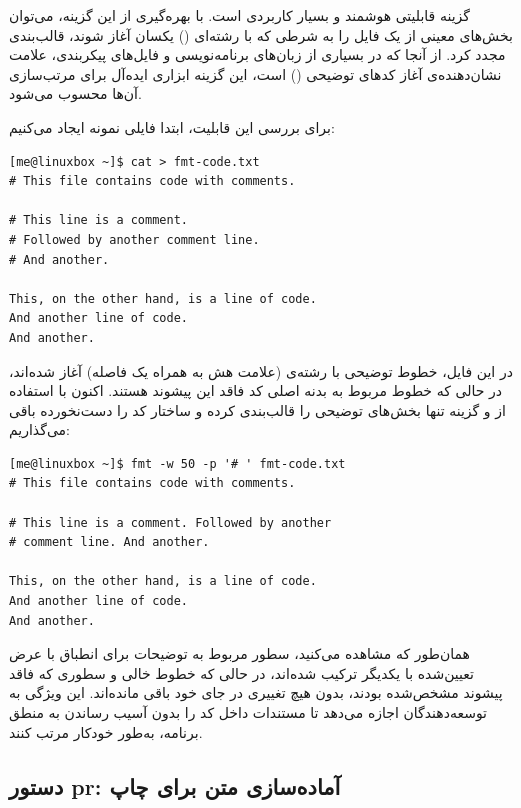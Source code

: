 گزینه  قابلیتی هوشمند و بسیار کاربردی است. با بهره‌گیری از این گزینه، می‌توان بخش‌های معینی از یک فایل را به شرطی که با رشته‌ای () یکسان آغاز شوند، قالب‌بندی مجدد کرد. از آنجا که در بسیاری از زبان‌های برنامه‌نویسی و فایل‌های پیکربندی، علامت \cmd{\#} نشان‌دهنده‌ی آغاز کدهای توضیحی () است، این گزینه ابزاری ایده‌آل برای مرتب‌سازی آن‌ها محسوب می‌شود.

برای بررسی این قابلیت، ابتدا فایلی نمونه ایجاد می‌کنیم:

\begin{latin}
\begin{lstlisting}
[me@linuxbox ~]$ cat > fmt-code.txt
# This file contains code with comments.

# This line is a comment.
# Followed by another comment line.
# And another.

This, on the other hand, is a line of code.
And another line of code.
And another.
\end{lstlisting}
\end{latin}

در این فایل، خطوط توضیحی با رشته‌ی \cmd{\#} (علامت هش به همراه یک فاصله) آغاز شده‌اند، در حالی که خطوط مربوط به بدنه اصلی کد فاقد این پیشوند هستند. اکنون با استفاده از  و گزینه  تنها بخش‌های توضیحی را قالب‌بندی کرده و ساختار کد را دست‌نخورده باقی می‌گذاریم:

\begin{latin}
\begin{lstlisting}
[me@linuxbox ~]$ fmt -w 50 -p '# ' fmt-code.txt
# This file contains code with comments.

# This line is a comment. Followed by another
# comment line. And another.

This, on the other hand, is a line of code.
And another line of code.
And another.
\end{lstlisting}
\end{latin}

همان‌طور که مشاهده می‌کنید، سطور مربوط به توضیحات برای انطباق با عرض تعیین‌شده با یکدیگر ترکیب شده‌اند، در حالی که خطوط خالی و سطوری که فاقد پیشوند مشخص‌شده بودند، بدون هیچ تغییری در جای خود باقی مانده‌اند. این ویژگی به توسعه‌دهندگان اجازه می‌دهد تا مستندات داخل کد را بدون آسیب رساندن به منطق برنامه، به‌طور خودکار مرتب کنند.

\subsection{دستور pr: آماده‌سازی متن برای چاپ}

